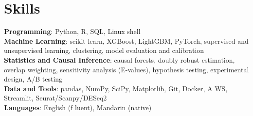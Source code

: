 \documentclass[letterpaper,11pt]{article}
\begin{document}
\section{\textbf{Skills}}
 \begin{itemize}[leftmargin=0.15in, label={}]
    \small{\item{
     \textbf{Programming}{: Python, R, SQL, Linux shell} \\
     \textbf{Machine Learning}{: scikit-learn, XGBoost, LightGBM, PyTorch, supervised and unsupervised learning, clustering, model evaluation and calibration} \\
     \textbf{Statistics and Causal Inference}{: causal forests, doubly robust estimation, overlap weighting, sensitivity analysis (E-values), hypothesis testing, experimental design, A/B testing} \\
     \textbf{Data and Tools}{: pandas, NumPy, SciPy, Matplotlib, Git, Docker, A\kern0pt WS, Streamlit, Seurat/Scanpy/DESeq2} \\
     \textbf{Languages}{: English (f\kern0pt luent), Mandarin (native)}}}

 \end{itemize}
\end{document}
